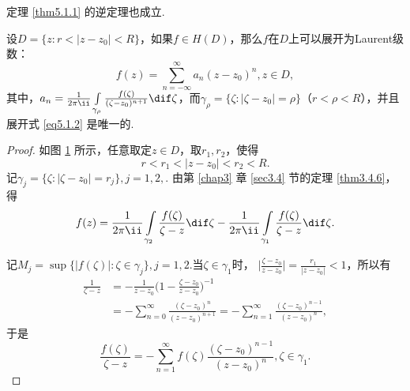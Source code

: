 定理 \ref{thm5.1.1} 的逆定理也成立.
\begin{theorem}\label{thm5.1.2}
设$D=\{z:r<|z-z_0|<R\}$，如果$f\in H(D)$，那么$f$在$D$上可以展开为Laurent级数：
\begin{equation}\label{eq5.1.2}
f(z)=\sum_{n=-\infty}^\infty a_n(z-z_0)^n,z\in D,
\end{equation}
其中，$a_n=\frac1{2\pi\ii}\int\limits_{\gamma_\rho}\frac{f(\zeta)}{(\zeta-z_0)^{n+1}}
\dif \zeta$，而$\gamma_\rho=\{\zeta:|\zeta-z_0|=\rho\}$（$r<\rho<R$），并且展开式 \eqref{eq5.1.2} 是唯一的.
\end{theorem}
\begin{proof}
如图 \ref{fig5.1} 所示，任意取定$z\in D$，取$r_1,r_2$，使得
\[r<r_1<|z-z_0|<r_2<R.\]
记$\gamma_j=\{\zeta:|\zeta-z_0|=r_j\},j=1,2,$. 由第 \ref{chap3} 章 \ref{sec3.4} 节的定理 \ref{thm3.4.6}，得
\begin{equation}\label{eq5.1.3}
f(z)=\frac1{2\pi\ii}\int\limits_{\gamma_2}\frac{f(\zeta)}{\zeta-z}\dif \zeta-
\frac1{2\pi\ii}\int\limits_{\gamma_1}\frac{f(\zeta)}{\zeta-z}\dif \zeta.
\end{equation}
\begin{figure}[!ht]
\centering
{}
\caption{\label{fig5.1}}
\end{figure}
记$M_j=\sup\{|f(\zeta)|:\zeta\in\gamma_j\},j=1,2$.当$\zeta\in\gamma_1$时，
$\bigg|\frac{\zeta-z_0}{z-z_0}\bigg|=\frac{r_1}{|z-z_0|}<1$，所以有
\begin{align*}
\frac1{\zeta-z}&=-\frac1{z-z_0}\bigg(1-\frac{\zeta-z_0}{z-z_0}\bigg)^{-1}\\
&=-\sum_{n=0}^\infty\frac{(\zeta-z_0)^n}{(z-z_0)^{n+1}}=-
\sum_{n=1}^\infty\frac{(\zeta-z_0)^{n-1}}{(z-z_0)^{n}},
\end{align*}
于是
\begin{equation}\label{eq5.1.4}
\frac{f(\zeta)}{\zeta-z}=-\sum_{n=1}^\infty f(\zeta)\frac{(\zeta-z_0)^{n-1}}{(z-z_0)^{n}},\zeta\in\gamma_1.

\end{equation}
\end{proof}
